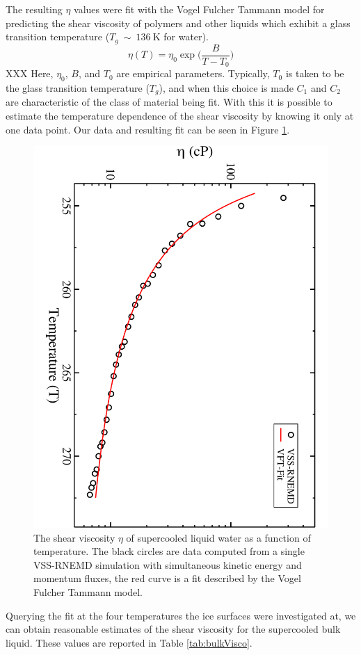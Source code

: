 The resulting $\eta$ values were fit with the Vogel Fulcher Tammann model
for predicting the shear viscosity of polymers and other liquids which
exhibit a glass transition temperature ($T_g~\sim~136~\mathrm{K}$ for
water). 
\begin{equation}\label{eq:WLF}
\eta (T) = \eta_0 \exp \Bigg({\frac{B}{T-T_0}}\Bigg)
\end{equation}
XXX
Here, $\eta_0$, $B$, and $T_0$ are empirical
parameters. Typically, $T_0$ is taken to be the glass transition
temperature ($T_g$), and when this choice is made $C_1$ and $C_2$ are
characteristic of the class of material being
fit. With this it is possible to estimate the temperature dependence
of the shear viscosity by knowing it only at one data point. Our data
and resulting fit can be seen in Figure \ref{fig:etaT}.
\begin{figure}
\includegraphics[width=\linewidth]{Figures/bulkVFT}
\caption{\label{fig:etaT} The shear viscosity $\eta$ of supercooled
  liquid water as a function of temperature. The black circles are
  data computed from a single VSS-RNEMD simulation with simultaneous
  kinetic energy and momentum fluxes, the red curve is a fit described
  by the Vogel Fulcher Tammann model.}
\end{figure} 
Querying the fit at the four temperatures the ice surfaces were
investigated at, we can obtain reasonable estimates of the shear
viscosity for the supercooled bulk liquid. These values are reported
in Table \ref{tab:bulkVisco}.
   

